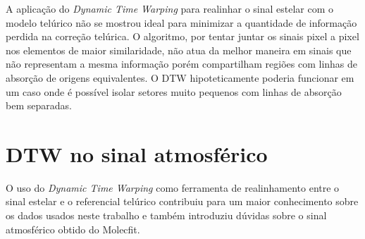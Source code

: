 A aplicação do \textit{Dynamic Time Warping} para realinhar o sinal estelar com o modelo telúrico não se mostrou ideal para minimizar a quantidade de informação perdida na correção telúrica. O algoritmo, por tentar juntar os sinais pixel a pixel nos elementos de maior similaridade, não atua da melhor maneira em sinais que não representam a mesma informação porém compartilham regiões com linhas de absorção de origens equivalentes. O DTW hipoteticamente poderia funcionar em um caso onde é possível isolar setores muito pequenos com linhas de absorção bem separadas.


\section{DTW no sinal atmosférico}

O uso do \textit{Dynamic Time Warping} como ferramenta de realinhamento entre o sinal estelar e o referencial telúrico contribuiu para um maior conhecimento sobre os dados usados neste trabalho e também introduziu dúvidas sobre o sinal atmosférico obtido do Molecfit.


